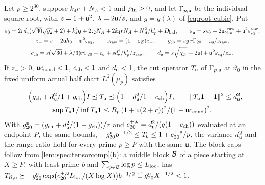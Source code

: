\begin{proposition}\label{prop:root-chamber}
Let $p\ge2^{30}$, suppose $k_4r+N_A<1$ and $\rho_{\rm in}>0$, and let
$\Gamma_{p,\mathsf u}$ be the individual-square root, with
$s=1+\mathsf u^2$, $\lambda=2\mathsf u/s$, and $g=g(\lambda)$ of
\eqref{eq:root-cubic}. Put
\begin{gather*}
 \varepsilon_0=2rd_{\mathfrak r}(\sqrt{30}\sqrt{g_{\mathbf z}}+2)+k_4^2q+2\mathfrak r_2N_A
   +2k_4rN_A+N_A^2/h'_p+D_{\rm bal},\qquad
 \varepsilon_\mathsf u=s\varepsilon_0+2\mathsf u\varepsilon^{\rm raw}_{\rm lin}+\mathsf u^2\varepsilon^{\rm raw}_{\rm sq},\\
 z_-=s-2\mathsf u h_0-\mathsf u^2\varepsilon_{\rm sq},\qquad z_{\rm raw}=(1-\varepsilon_Z)z_-,\qquad
 g_{\rm ch}=sg\,r\Gamma_{20}+\varepsilon_\mathsf u/z_{\rm raw},\\
 c_{\rm ch}=s(\sqrt{30}+\lambda/3)r\Gamma_{20}+\varepsilon_\mathsf u+sd_{\mathfrak r}^2/h'_p/z_{\rm raw},
 \qquad
 d_\mathsf u=s\sqrt{\chi^+_p}+2\mathsf u\mathfrak l+\mathsf u^2\varepsilon_{\rm sq}/z_-.
\end{gather*}
If $z_->0$, $\mathsf u c_{\rm cond}<1$, $c_{\rm ch}<1$ and $d_\mathsf u<1$, the cut operator
$T_\mathsf u$ of $\Gamma_{p,\mathsf u}$ at $\vartheta_0$ in the fixed uniform actual half chart
$L^2(\mu_p)$ satisfies
\begin{gather*}
 -\Bigl(g_{\rm ch}+d_\mathsf u^2/1+g_{\rm ch}\Bigr)I\preceq T_\mathsf u\preceq
 \Bigl(1+d_\mathsf u^2/1-c_{\rm ch}\Bigr)I,\qquad \|T_\mathsf u\mathbf 1-\mathbf 1\|^2\le d_\mathsf u^2,\\
 \sup T_\mathsf u\mathbf 1/\inf T_\mathsf u\mathbf 1\le R_p\,(1+\mathsf u(2+r))^2/(1-\mathsf u c_{\rm cond})^2.
\end{gather*}
With $g^\mathsf u_{20}=(g_{\rm ch}+d_\mathsf u^2/(1+g_{\rm ch}))/r$ and
$c^{+,\mathsf u}_{20}=d_\mathsf u^2/(q(1-c_{\rm ch}))$ evaluated at an endpoint $P$, the same bounds,
$-g^\mathsf u_{20}p^{-1/2}\le T_\mathsf u\le1+c^{+,\mathsf u}_{20}/p$, the variance $d_\mathsf u^2$ and the
range ratio hold for every prime $p\ge P$ with the same $\mathsf u$. The block caps follow from
\cref{lem:spec:tensorcomp}(b): a middle block $\mathcal B$ of a piece starting at $X\ge P$, with
least prime $b$ and $\sum_{p\in\mathcal B}\log p\le L_{\rm loc}$, has
$T_{\mathcal B,\mathsf u}\succeq-g^\mathsf u_{20}\exp\bigl(c^{+,\mathsf u}_{20}L_{\rm loc}/(X\log X)\bigr)b^{-1/2}$
if $g^\mathsf u_{20}X^{-1/2}<1$.
\end{proposition}


